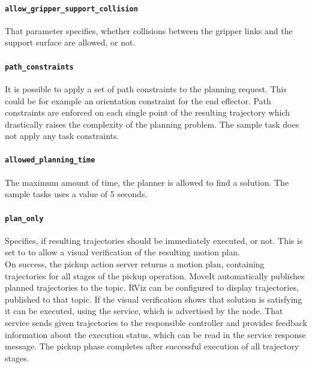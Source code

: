 \paragraph{\texttt{allow\_gripper\_support\_collision}} That parameter specifies, whether collisions between the gripper links and the support surface are allowed, or not.
\paragraph{\texttt{path\_constraints}} It is possible to apply a set of path constraints to the planning request. This could be for example an orientation constraint for the end effector. Path constraints are enforced on each single point of the resulting trajectory which drastically raises the complexity of the planning problem. The sample task does not apply any task constraints.
\paragraph{\texttt{allowed\_planning\_time}} The maximum amount of time, the planner is allowed to find a solution. The sample tasks uses a value of 5 seconds.
\paragraph{\texttt{plan\_only}} Specifies, if resulting trajectories should be immediately executed, or not. This is set to  to allow a visual verification of the resulting motion plan. \\

On success, the pickup action server returns a motion plan, containing trajectories for all stages of the pickup operation. MoveIt automatically publishes planned trajectories to the  topic. RViz can be configured to display trajectories, published to that topic. If the visual verification shows that solution is satisfying it can be executed, using the  service, which is advertised by the  node. That service sends given trajectories to the responsible controller and provides feedback information about the execution status, which can be read in the service response message. The pickup phase completes after successful execution of all trajectory stages.

